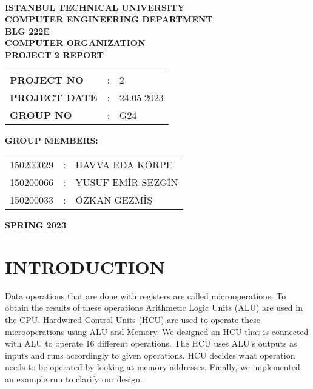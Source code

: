 \documentclass[pdftex,12pt,a4paper]{article}
\begin{document}
\begin{titlepage}
\begin{center}
\textbf{}\\
\textbf{\Large{ISTANBUL TECHNICAL UNIVERSITY}}\\
\vspace{0.5cm}
\textbf{\Large{COMPUTER ENGINEERING DEPARTMENT}}\\
\vspace{2cm}
\textbf{\Large{BLG 222E\\ COMPUTER ORGANIZATION\\ PROJECT 2 REPORT}}\\
\vspace{2.8cm}
\begin{table}[ht]
\centering
\Large{
\begin{tabular}{lcl}
\textbf{PROJECT NO}  & : & 2 \\
\textbf{PROJECT DATE}  & : & 24.05.2023 \\
\textbf{GROUP NO}  & : & G24 \\
\end{tabular}}
\end{table}
\vspace{1cm}
\textbf{\Large{GROUP MEMBERS:}}\\
\begin{table}[ht]
\centering
\Large{
\begin{tabular}{rcl}
150200029  & : & HAVVA EDA KÖRPE \\
150200066  & : & YUSUF EMİR SEZGİN \\
150200033  & : & ÖZKAN GEZMİŞ \\
\end{tabular}}
\end{table}
\vspace{2.8cm}
\textbf{\Large{SPRING 2023}}

\end{center}

\end{titlepage}

\thispagestyle{empty}

\setcounter{tocdepth}{4}
\tableofcontents
\clearpage

\setcounter{page}{1}

\section{INTRODUCTION}
Data operations that are done with registers are called microoperations. To obtain the results of these operations Arithmetic Logic Units (ALU) are used in the CPU. Hardwired Control Units (HCU) are used to operate these microoperations using ALU and Memory. We designed an HCU that is connected with ALU to operate 16 different operations. The HCU uses ALU's outputs as inputs and runs accordingly to given operations. HCU decides what operation needs to be operated by looking at memory addresses. Finally, we implemented an example run to clarify our design.
\end{document}
